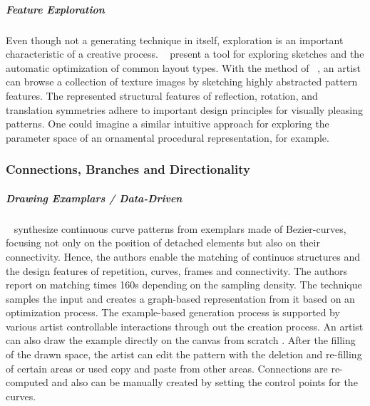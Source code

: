 \subparagraph{Feature Exploration}
\label{subpara:analysis_rulebased_sketchbased_feature_exploration}

Even though not a generating technique in itself, exploration is an important characteristic of a creative process. \citeauthor*{todi_2016_sse}~\cite{todi_2016_sse} present a tool for exploring sketches and the automatic optimization of common layout types. With the method of \citeauthor*{chen_2016_msi}~\cite{chen_2016_msi}, an artist can browse a collection of texture images by sketching highly abstracted pattern features. The represented structural features of reflection, rotation, and translation symmetries adhere to important design principles for visually pleasing patterns. One could imagine a similar intuitive approach for exploring the parameter space of an ornamental procedural representation, for example.



\subsubsection{Connections, Branches and Directionality}
\label{subsubsec:analysis_connections_branches_and_directionality}




\subparagraph{Drawing Examplars / Data-Driven}
\label{subpara:analysis_connections_branches_and_directionality_drawing}



\citeauthor*{tu_2020_cct}~\cite{tu_2020_cct} synthesize continuous curve patterns from exemplars made of Bezier-curves, focusing not only on the position of detached elements but also on their connectivity. Hence, the authors enable the matching of continuos structures and the design features of repetition, curves, frames and connectivity. The authors report on matching times 160s depending on the sampling density. The technique samples the input and creates a graph-based representation from it based on an optimization process. The example-based generation process is supported by various artist controllable interactions through out the creation process. An artist can also draw the example directly on the canvas from scratch . After the filling of the drawn space, the artist can edit the pattern with the deletion and re-filling of certain areas or used copy and paste from other areas. Connections are re-computed and also can be manually created by setting the control points for the curves. 


